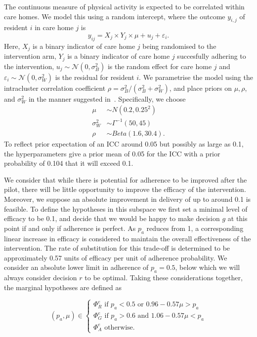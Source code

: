 \documentclass{article} %
\begin{document}
The continuous measure of physical activity is expected to be correlated within care homes. We model this using a random intercept, where the outcome $y_{i,j}$ of resident $i$ in care home $j$ is
\begin{equation}
y_{ij} = X_{j} \times Y_{j} \times \mu + u_{j} + \varepsilon_{i}.
\end{equation}
Here, $X_{j}$ is a binary indicator of care home $j$ being randomised to the intervention arm, $Y_{j}$ is a binary indicator of care home $j$ succesfully adhering to the intervention, $u_{j} \sim \mathcal{N}(0, \sigma_{B}^{2})$ is the random effect for care home $j$ and $\varepsilon_{i} \sim \mathcal{N}(0, \sigma_{W}^{2})$ is the residual for resident $i$. We parametrise the model using the intracluster correlation coefficient $\rho = \sigma_{B}^{2} / (\sigma_{B}^{2} + \sigma_{W}^{2})$, and place priors on $\mu, \rho$, and $\sigma_{W}^{2}$ in the manner suggested in~\cite{Spiegelhalter2001}. Specifically, we choose
\begin{align}
\mu & \sim N(0.2, 0.25^{2}) \\
\sigma_{W}^{2} & \sim \Gamma^{-1}(50, 45) \\
\rho & \sim Beta(1.6, 30.4).
\end{align}
To reflect prior expectation of an ICC around 0.05 but possibly as large as 0.1, the hyperparameters give a prior mean of 0.05 for the ICC with a prior probability of 0.104 that it will exceed 0.1. 

We consider that while there is potential for adherence to be improved after the pilot, there will be little opportunity to improve the efficacy of the intervention. Moreover, we suppose an absolute improvement in delivery of up to around 0.1 is feasible. To define the hypotheses in this subspace we first set a minimal level of efficacy to be 0.1, and decide that we would be happy to make decision $g$ at this point if and only if adherence is perfect. As $p_{a}$ reduces from 1, a corresponding linear increase in efficacy is considered to maintain the overall effectiveness of the intervention. The rate of substitution for this trade-off is determined to be approximately 0.57 units of efficacy per unit of adherence probability. We consider an absolute lower limit in adherence of $p_{a} = 0.5$, below which we will always consider decision $r$ to be optimal. Taking these considerations together, the marginal hypotheses are defined as

\begin{equation}
  (p_{a}, \mu) \in \begin{cases}
               \Phi^e_R \text{ if } p_{a} < 0.5 \text{ or } 0.96-0.57\mu > p_{a} \\
               \Phi^e_G \text{ if } p_{a} > 0.6 \text{ and } 1.06-0.57\mu < p_{a} \\
               \Phi^e_A \text{ otherwise.}
            \end{cases}
\end{equation}
\end{document}
